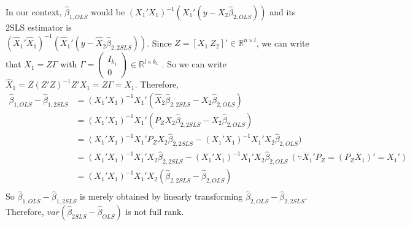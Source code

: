 In our context, $\hat{\beta}_{1,OLS}$ would be $(X_1'X_1)^{-1}(X_1'(y-X_2\hat{\beta}_{2,OLS}))$ and its 2SLS estimator is \\ $(\widehat{X}_1'\widehat{X}_1)^{-1}(\widehat{X}_1'(y-\widehat{X}_2\hat{\beta}_{2,2SLS}))$. Since $Z=[X_1 \ Z_2]'\in\mathbb{R}^{n\times l }$, we can write that $X_1=Z\Gamma$ with $\Gamma=\begin{pmatrix}I_{k_1}\\ 0\end{pmatrix}\in\mathbb{R}^{l \times k_1}$ . So we can write $\widehat{X}_1 = Z(Z'Z)^{-1}Z'X_1=Z\Gamma=X_1$. Therefore, 
\[
\begin{aligned}
\hat{\beta}_{1,OLS}-\hat{\beta}_{1,2SLS}& =(X_1'X_1)^{-1}X_1'(\widehat{X}_2\hat{\beta}_{2,2SLS}-X_2\hat{\beta}_{2,OLS})\\
&=(X_1'X_1)^{-1}X_1'(P_ZX_2\hat{\beta}_{2,2SLS}-X_2\hat{\beta}_{2,OLS})\\
&=(X_1'X_1)^{-1}X_1'P_ZX_2\hat{\beta}_{2,2SLS}-(X_1'X_1)^{-1}X_1'X_2\hat{\beta}_{2,OLS})\\
&=(X_1'X_1)^{-1}X_1'X_2\hat{\beta}_{2,2SLS}-(X_1'X_1)^{-1}X_1'X_2\hat{\beta}_{2,OLS} \ (\because X_1'P_Z=(P_ZX_1)'=X_1')\\
&=(X_1'X_1)^{-1}X_1'X_2(\hat{\beta}_{2,2SLS}-\hat{\beta}_{2,OLS})\\
\end{aligned}
\]
So $\hat{\beta}_{1,OLS}-\hat{\beta}_{1,2SLS}$ is merely obtained by linearly transforming $\hat{\beta}_{2,OLS}-\hat{\beta}_{2,2SLS}$. Therefore, $var(\hat{\beta}_{2SLS}-\hat{\beta}_{OLS})$ is not full rank. 
